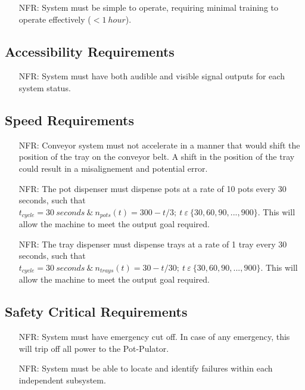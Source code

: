 \documentclass[12pt]{article}
\newcounter{nfrnum} %
\begin{document}
  \noindent \begin{itemize}
  \item[NFR\refstepcounter{nfrnum}\thenfrnum \label{NFR_Learning}:]
  System must be simple to operate, requiring minimal training to operate effectively ($<1\ hour$).

  \end{itemize}


  \subsection{Accessibility Requirements}
 \noindent \begin{itemize}
  \item[NFR\refstepcounter{nfrnum}\thenfrnum \label{NFR_Accessibility1}:]
  System must have both audible and visible signal outputs for each system status.
 \end{itemize}

  \subsection{Speed Requirements}
  \noindent \begin{itemize}
  \item[NFR\refstepcounter{nfrnum}\thenfrnum \label{NFR_Speed1}:]
  Conveyor system must not accelerate in a manner that would shift the position of the tray on the conveyor belt. 
  A shift in the position of the tray could result in a misalignement and potential error.
  
  \item[NFR\refstepcounter{nfrnum}\thenfrnum \label{NFR_Speed2}:] 
  {The pot dispenser must dispense pots at a rate of 10 pots every 30 seconds, such that $t_{cycle}=30\ seconds
      \ \&\ n_{pots}\left(t\right)=300-t/3;\ t\ \varepsilon\ \{30, 60, 90, ..., 900\}$}.
  This will allow the machine to meet the output goal required.

  \item[NFR\refstepcounter{nfrnum}\thenfrnum \label{NFR_Speed3}:] 
  {The tray dispenser must dispense trays at a rate of 1 tray every 30 seconds, such that $t_{cycle}=30\ seconds
      \ \&\ n_{trays}\left(t\right)=30-t/30;\ t\ \varepsilon\ \{30, 60, 90, ..., 900\}$}.
  This will allow the machine to meet the output goal required.
  \end{itemize}  


  \subsection{Safety Critical Requirements}
  \noindent \begin{itemize}
  \item[NFR\refstepcounter{nfrnum}\thenfrnum \label{NFR_Safety1}:]
  System must have emergency cut off. In case of any emergency, this will trip off all power to the Pot-Pulator.
  
  \item[NFR\refstepcounter{nfrnum}\thenfrnum \label{NFR_Safety2}:]
  System must be able to locate and identify failures within each independent subsystem.
  
  \end{itemize}
\end{document}
